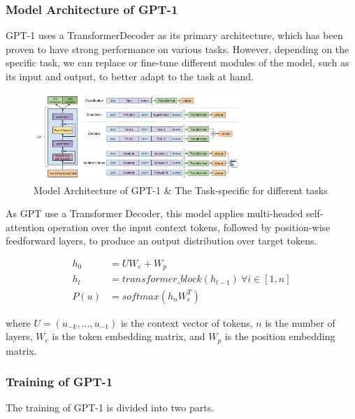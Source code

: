 \documentclass[conference]{IEEEtran}
\begin{document}
\subsubsection{Model Architecture of GPT-1}

\par GPT-1 uses a TransformerDecoder as its primary architecture, 
which has been proven to have strong performance on various tasks. However, 
depending on the specific task, we can replace or fine-tune different modules 
of the model, such as its input and output, to better adapt to the task at hand.

\begin{figure}[htbp]
    \centerline{\includegraphics[width = 8cm]{pic/fig5.png}}
    \caption{Model Architecture of GPT-1 \& The Task-specific for different tasks}
    \label{fig}
\end{figure}

\par As GPT use a Transformer Decoder, this model applies multi-headed self-attention 
operation over the input context tokens, followed by position-wise feedforward layers, 
to produce an output distribution over target tokens.

\begin{align*}
    h_0 &= UW_e + W_p \\
    h_l &= transformer\_block(h_{l-1})\ \forall i \in \left[1, n\right] \\
    P(u) &= softmax(h_n W_e^T)
\end{align*}

\par where $U = (u_{-k}, ..., u_{-1})$ is the context vector of tokens, $n$ is the number of layers, 
$W_e$ is the token embedding matrix, and $W_p$ is the position embedding matrix.

\subsubsection{Training of GPT-1}

\par The training of GPT-1 is divided into two parts.
\end{document}
